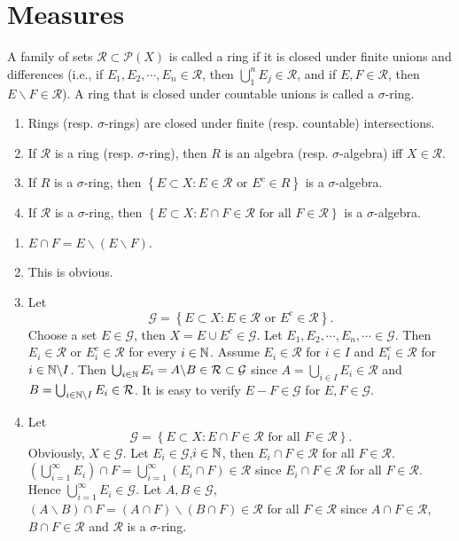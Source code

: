 \chapter{Measures}
\begin{exe}
  A family of sets $\mathcal{R}\subset\mathcal{P}(X)$ is called a ring if it is closed under finite unions and differences (i.e., if $E_1,E_2,\cdots,E_n\in\mathcal{R}$, then $\bigcup_{1}^{n}E_j\in \mathcal{R}$, and if $E,F\in\mathcal{R}$, then $E\backslash F \in \mathcal{R}$). A ring that is closed under countable unions is called a $\sigma$-ring.
\begin{enumerate}
  \item Rings (resp. $\sigma$-rings) are closed under finite (resp. countable) intersections.
  \item If $\mathcal{R}$ is a ring (resp. $\sigma$-ring), then $R$ is an algebra (resp. $\sigma$-algebra) iff $X\in\mathcal{R}$.
  \item If $R$ is a $\sigma$-ring, then $\left\{ E\subset X:E\in \mathcal{R} \text{ or } E^{c}\in R \right\} $ is a $\sigma$-algebra.
  \item If $\mathcal{R}$ is a $\sigma$-ring, then $\left\{ E\subset X:E\cap F\in \mathcal{R}\text{ for all } F\in \mathcal{R}   \right\} $ is a  $\sigma$-algebra.
\end{enumerate}
\end{exe}
\begin{sol}
  \begin{enumerate}
    \item $E\cap F=E\backslash\left( E\backslash F \right) $.
    \item This is obvious.
    \item Let 
      \[
	\mathcal{G}=\left\{ E\subset X:E\in \mathcal{R}\text{ or } E^{c}\in \mathcal{R} \right\} 
      .\] 
      Choose a set  $E\in \mathcal{G}$, then $X=E\cup E^{c}\in \mathcal{G}$. Let $E_1,E_2,\cdots,E_n,\cdots \in \mathcal{G}$. Then $E_i\in \mathcal{R}$ or $E_i^{c} \in \mathcal{R}$ for every $i\in \mathbb{N}$. Assume $E_i\in\mathcal{R}$ for $i\in I$ and $E_i^{c}\in \mathcal{R}$ for $i\in\mathbb{N}\backslash I$. Then $\bigcup_{i\in \mathbb{N}} E_i=A\backslash B\in \mathcal{R}\subset \mathcal{G}$ since $A=\bigcup_{i \in  I} E_i\in \mathcal{R}$ and $B=\bigcup_{i \in \mathbb{N}\backslash I} E_i\in \mathcal{R}$. It is easy to verify  $E-F\in \mathcal{G}$ for $E,F\in \mathcal{G}$.
    \item Let \[
	\mathcal{G}=\left\{ E\subset X:E\cap F\in \mathcal{R} \text{ for all } F\in \mathcal{R} \right\} 
    .\] 
    Obviously, $X\in \mathcal{G}$. Let $E_i\in \mathcal{G}$,$i\in \mathbb{N}$, then $E_i\cap F\in \mathcal{R}$ for all $F\in \mathcal{R}$. $\left(\bigcup_{i=1}^{\infty}E_i\right) \cap F=\bigcup_{i=1}^{\infty}\left( E_i\cap F \right)\in \mathcal{R}  $ 
    since $E_{i}\cap F\in \mathcal{R}$ for all $F\in \mathcal{R}$. Hence $\bigcup_{i=1}^{\infty}E_i\in \mathcal{G}$. Let $A,B\in \mathcal{G}$, $\left(A\backslash B\right)\cap F=\left( A\cap F \right)\backslash \left( B\cap F \right) \in \mathcal{R} $ for all $F\in \mathcal{R}$ since $A\cap F\in \mathcal{R}$,$B\cap F\in \mathcal{R}$ and  $\mathcal{R}$ is a $\sigma$-ring. 
\end{enumerate}

\end{sol}


